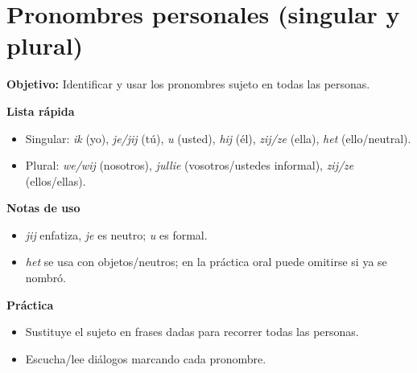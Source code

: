 \section{Pronombres personales (singular y plural)}
\textbf{Objetivo:} Identificar y usar los pronombres sujeto en todas las personas.

\textbf{Lista rápida}
\begin{itemize}[leftmargin=*]
  \item Singular: \textit{ik} (yo), \textit{je/jij} (tú), \textit{u} (usted), \textit{hij} (él), \textit{zij/ze} (ella), \textit{het} (ello/neutral).
  \item Plural: \textit{we/wij} (nosotros), \textit{jullie} (vosotros/ustedes informal), \textit{zij/ze} (ellos/ellas).
\end{itemize}

\textbf{Notas de uso}
\begin{itemize}[leftmargin=*]
  \item \textit{jij} enfatiza, \textit{je} es neutro; \textit{u} es formal.
  \item \textit{het} se usa con objetos/neutros; en la práctica oral puede omitirse si ya se nombró.
\end{itemize}

\textbf{Práctica}
\begin{itemize}[leftmargin=*]
  \item Sustituye el sujeto en frases dadas para recorrer todas las personas.
  \item Escucha/lee diálogos marcando cada pronombre.
\end{itemize}
